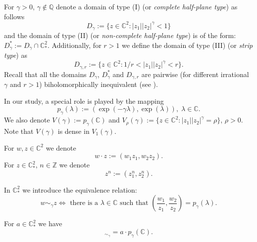 \documentclass[a4paper,12pt]{amsart}
\theoremstyle{definition}
\begin{document}
For $\gamma>0$, 
$\gamma\not\in\mathbb Q$ denote a domain of type (I) (or {\it complete half-plane type}) as follows
\begin{equation}
D_{\gamma}:=\{z\in\mathbb C^2:|z_1||z_2|^{\gamma}<1\}
\end{equation}
and the domain of type (II) (or {\it non-complete half-plane type}) is of the form: 
$D_{\gamma}^*:=D_{\gamma}\cap \mathbb C_*^2$. Additionally, for $r>1$ we define the domain of type (III) (or {\it strip type}) as
\begin{equation}
    D_{\gamma,r}:=\{z\in\mathbb C^2:1/r<|z_1||z_2|^{\gamma}< r\}.
\end{equation}
Recall that all the domains $D_{\gamma}$, $D_{\gamma}^*$ and $D_{\gamma,r}$ are pairwise (for different irrational $\gamma$ and $r>1$) biholomorphically inequivalent (see \cite{05208635}).

In our study, a special role is played by the mapping
\begin{equation}
    p_{\gamma}(\lambda):=(\exp(-\gamma\lambda),\exp(\lambda)),\;\lambda\in\mathbb C.
\end{equation}
We also denote $V(\gamma):=p_{\gamma}(\mathbb C)$ and $V_{\rho}(\gamma):=\{z\in\mathbb C^2:|z_1||z_2|^{\gamma}=\rho\}$, $\rho>0$. Note that $V(\gamma)$ is dense in $V_1(\gamma)$.

For $w,z\in\mathbb C^2$ we denote
\begin{equation}
    w\cdot z:=(w_1z_1,w_2z_2).
\end{equation}
For $z\in\mathbb C_*^2$, $n\in\mathbb Z$ we denote
\begin{equation}
    z^n:=(z_1^n,z_2^n).
\end{equation}

In $\mathbb C^2_*$ we introduce the equivalence relation:
\begin{equation}
    w\sim_{\gamma} z \iff \text{ there is a $\lambda\in\mathbb C$ such that } \left(\frac{w_1}{z_1},\frac{w_2}{z_2}\right)=p_{\gamma}(\lambda).
\end{equation}

For $a\in\mathbb C_*^2$ we have
\begin{equation}
[a]_{\sim_{\gamma}}=a\cdot p_{\gamma}(\mathbb C).
\end{equation}
\end{document}
